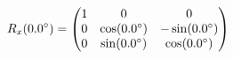 \documentclass[preview]{standalone}
\begin{document}
\begin{align*}
\special{dvisvgm:raw <g id='unique000'>}R_x(0.0^\circ) = \begin{pmatrix} 1 & 0 & 0 \\ 0 & \cos(0.0^\circ) & -\sin(0.0^\circ) \\ 0 & \sin(0.0^\circ) & \cos(0.0^\circ) \end{pmatrix}\special{dvisvgm:raw </g>}
\end{align*}
\end{document}
